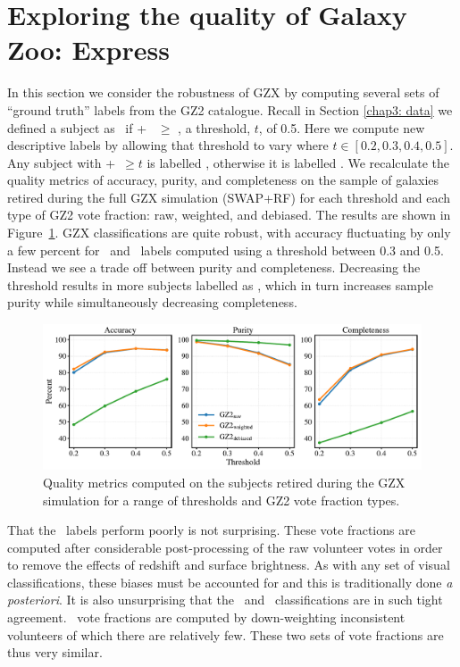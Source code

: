 \section{Exploring the quality of Galaxy Zoo: Express}
\label{chap3: vary threshold}

In this section we consider the robustness of GZX by computing several sets of ``ground truth'' labels from the GZ2 catalogue. Recall in Section \ref{chap3: data} we defined a subject as \feat~if \ffeat+ \fstar~$\ge$ \fsmooth, a threshold, $t$, of 0.5. Here we compute new descriptive labels by allowing that threshold to vary where $t \in [0.2, 0.3, 0.4, 0.5]$.  Any subject with \ffeat+\fstar~$\ge t$ is labelled \feat, otherwise it is labelled \notfeat. We recalculate the quality metrics of accuracy, purity, and completeness on the sample of galaxies retired during the full GZX simulation (SWAP+RF) for each threshold and each type of GZ2 vote fraction: raw, weighted, and debiased. The results are shown in Figure~\ref{fig: quality}. GZX classifications are quite robust, with accuracy fluctuating by only a few percent for \raw~and \weighted~labels computed using a threshold between 0.3 and 0.5. Instead we see a trade off between purity and completeness. Decreasing the threshold results in more subjects labelled as \feat, which in turn increases sample purity while simultaneously decreasing completeness.


\begin{figure}[t!]
\includegraphics[width=\textwidth]{Figures/human_machine/A1.pdf}
\caption{Quality metrics computed on the subjects retired during the GZX simulation for a range of thresholds and GZ2 vote fraction types. }
\label{fig: quality}
\end{figure}


That the \deb~labels perform poorly is not surprising. These vote fractions are computed after considerable post-processing of the raw volunteer votes in order to remove the effects of redshift and surface brightness. As with any set of visual classifications, these biases must be accounted for and this is traditionally done \textit{a posteriori}.  It is also unsurprising that the \raw~and \weighted~classifications are in such tight agreement. \weighted~vote fractions are computed by down-weighting inconsistent volunteers of which there are relatively few. These two sets of vote fractions are thus very similar.

